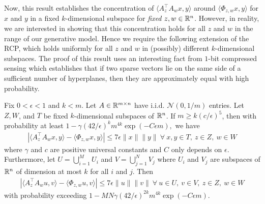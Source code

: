 \documentclass{article}
\begin{document}
Now, this result establishes the concentration of $\langle A_z^\top A_w x,y \rangle$ around $\langle \Phi_{z,w}x,y \rangle$ for $x$ and $y$ in a fixed $k$-dimensional subspace for \textit{fixed} $z,w \in \mathbb{R}^n$. However, in reality, we are interested in showing that this concentration holds for all $z$ and $w$ in the range of our generative model. Hence we require the following extension of the RCP, which holds uniformly for all $z$ and $w$ in (possibly) different $k$-dimensional subspaces. The proof of this result uses an interesting fact from $1$-bit compressed sensing \cite{Vershynin_hyperplane_thm} which establishes that if two sparse vectors lie on the same side of a sufficient number of hyperplanes, then they are approximately equal with high probability.


\begin{prop}
Fix $0 < \epsilon < 1$ and $k < m$. Let $A \in \mathbb{R}^{m \times n}$ have i.i.d. $\mathcal{N}(0,1/m)$ entries. Let $Z,W$, and $T$ be fixed $k$-dimensional subspaces of $\mathbb{R}^n$. If $m \geq k(c/\epsilon)^5$, then with probability at least $1 - \gamma (42/\epsilon)^k m^{4k}\exp(-C \epsilon m),$ we have \begin{align}
\left|\langle A_z^\top A_w x,y \rangle - \langle \Phi_{z,w}x,y \rangle\right| \leq 7\epsilon \|x\|\|y\|\ \forall\ x,y \in T,\ z \in Z,\ w \in W \label{Uniform_RCP_firstbound}
\end{align} where $\gamma$ and $c$ are positive universal constants and $C$ only depends on $\epsilon$. Furthermore, let $U = \bigcup_{i=1}^M U_i$ and $V = \bigcup_{j=1}^N V_j$ where $U_i$ and $V_j$ are subspaces of $\mathbb{R}^n$ of dimension at most $k$ for all $i$ and $j$. Then
\begin{align}
\left|\langle A_z^\top A_w u,v \rangle - \langle \Phi_{z,w}u,v \rangle\right| \leq 7\epsilon \|u\|\|v\|\ \forall\ u \in U,\ v \in V,\ z \in Z,\ w \in W \label{Uniform_RCP_secondbound}
\end{align} with probability exceeding $1 - MN\gamma (42/\epsilon)^{2k}m^{4k}\exp(-C \epsilon m)$.
\end{prop}
\end{document}
